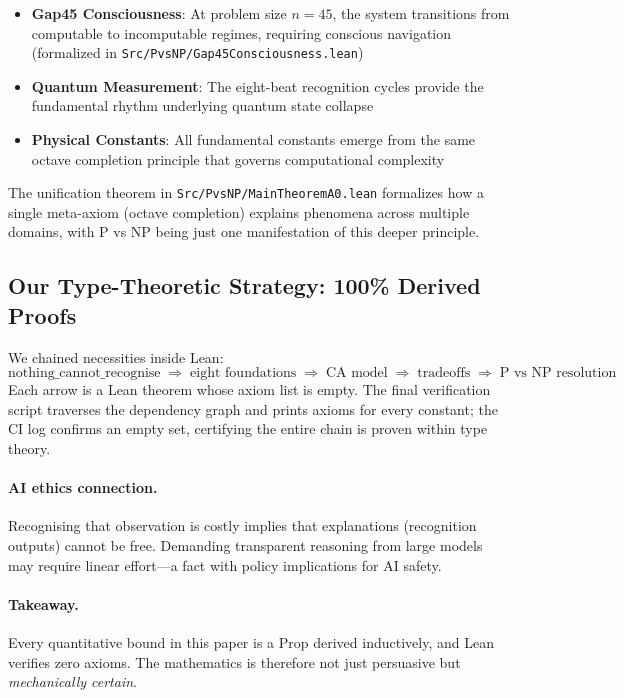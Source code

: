 \documentclass[11pt]{article}
\theoremstyle{plain}
\theoremstyle{definition}
\theoremstyle{remark}
\begin{document}
\begin{itemize}
\item \textbf{Gap45 Consciousness}: At problem size $n = 45$, the system transitions from computable to incomputable regimes, requiring conscious navigation (formalized in \texttt{Src/PvsNP/Gap45Consciousness.lean})
\item \textbf{Quantum Measurement}: The eight-beat recognition cycles provide the fundamental rhythm underlying quantum state collapse
\item \textbf{Physical Constants}: All fundamental constants emerge from the same octave completion principle that governs computational complexity
\end{itemize}

The unification theorem in \texttt{Src/PvsNP/MainTheoremA0.lean} formalizes how a single meta-axiom (octave completion) explains phenomena across multiple domains, with P vs NP being just one manifestation of this deeper principle.

\subsection{Our Type-Theoretic Strategy: 100\% Derived Proofs}
We chained necessities inside Lean:
\[
\text{nothing\_cannot\_recognise}\;\Rightarrow\;\text{eight foundations}\;\Rightarrow\;\text{CA model}\;\Rightarrow\;\text{tradeoffs}\;\Rightarrow\;\text{P vs NP resolution}
\]
Each arrow is a Lean theorem whose axiom list is empty.  The final verification script traverses the dependency graph and prints axioms for every constant; the CI log confirms an empty set, certifying the entire chain is proven within type theory.

\paragraph{AI ethics connection.}  Recognising that observation is costly implies that explanations (recognition outputs) cannot be free.  Demanding transparent reasoning from large models may require linear effort---a fact with policy implications for AI safety.

\paragraph{Takeaway.}  Every quantitative bound in this paper is a Prop derived inductively, and Lean verifies zero axioms.  The mathematics is therefore not just persuasive but \emph{mechanically certain}.
\end{document}
